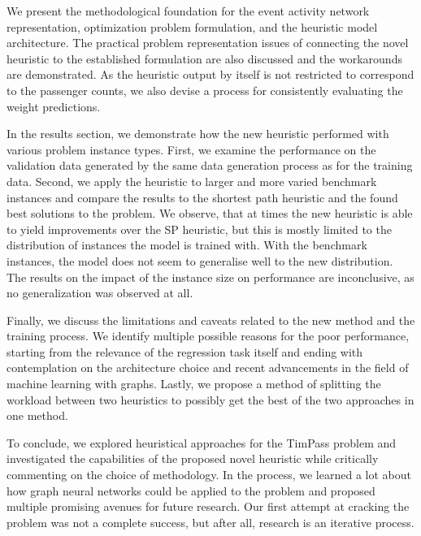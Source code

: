 \documentclass[english, 12pt, a4paper, sci, utf8, a-2b, online]{aaltothesis}
\begin{document}
We present the methodological foundation for the event activity network representation, optimization problem formulation, and the heuristic model architecture. The practical problem representation issues of connecting the novel heuristic to the established formulation are also discussed and the workarounds are demonstrated. As the heuristic output by itself is not restricted to correspond to the passenger counts, we also devise a process for consistently evaluating the weight predictions.

In the results section, we demonstrate how the new heuristic performed with various problem instance types. First, we examine the performance on the validation data generated by the same data generation process as for the training data. Second, we apply the heuristic to larger and more varied benchmark instances and compare the results to the shortest path heuristic and the found best solutions to the problem. We observe, that at times the new heuristic is able to yield improvements over the SP heuristic, but this is mostly limited to the distribution of instances the model is trained with. With the benchmark instances, the model does not seem to generalise well to the new distribution. The results on the impact of the instance size on performance are inconclusive, as no generalization was observed at all.

Finally, we discuss the limitations and caveats related to the new method and the training process. We identify multiple possible reasons for the poor performance, starting from the relevance of the regression task itself and ending with contemplation on the architecture choice and recent advancements in the field of machine learning with graphs. Lastly, we propose a method of splitting the workload between two heuristics to possibly get the best of the two approaches in one method.

To conclude, we explored heuristical approaches for the TimPass problem and investigated the capabilities of the proposed novel heuristic while critically commenting on the choice of methodology. In the process, we learned a lot about how graph neural networks could be applied to the problem and proposed multiple promising avenues for future research. Our first attempt at cracking the problem was not a complete success, but after all, research is an iterative process.

\clearpage
\thesisbibliography

 
%  

\end{document}
